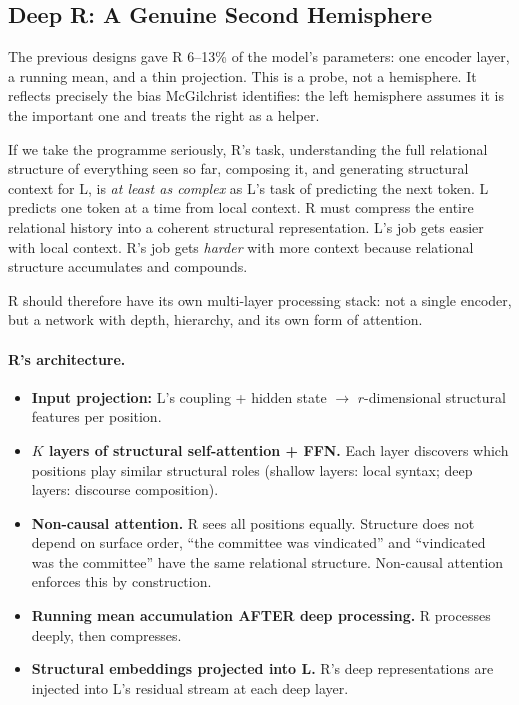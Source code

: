 \documentclass[11pt, a4paper]{article}
\theoremstyle{plain}
\theoremstyle{definition}
\theoremstyle{remark}
\begin{document}
\subsection{Deep R: A Genuine Second Hemisphere}
\label{sec:deep-r}

The previous designs gave R 6--13\% of the model's parameters: one encoder layer, a running mean, and a thin projection.
This is a probe, not a hemisphere.
It reflects precisely the bias McGilchrist identifies: the left hemisphere assumes it is the important one and treats the right as a helper.

If we take the programme seriously, R's task, understanding the full relational structure of everything seen so far, composing it, and generating structural context for L, is \emph{at least as complex} as L's task of predicting the next token.
L predicts one token at a time from local context.
R must compress the entire relational history into a coherent structural representation.
L's job gets easier with local context.
R's job gets \emph{harder} with more context because relational structure accumulates and compounds.

R should therefore have its own multi-layer processing stack: not a single encoder, but a network with depth, hierarchy, and its own form of attention.

\paragraph{R's architecture.}
\begin{itemize}[nosep]
\item \textbf{Input projection:} L's coupling + hidden state $\to$ $r$-dimensional structural features per position.
\item \textbf{$K$ layers of structural self-attention + FFN.} Each layer discovers which positions play similar structural roles (shallow layers: local syntax; deep layers: discourse composition).
\item \textbf{Non-causal attention.} R sees all positions equally. Structure does not depend on surface order, ``the committee was vindicated'' and ``vindicated was the committee'' have the same relational structure. Non-causal attention enforces this by construction.
\item \textbf{Running mean accumulation AFTER deep processing.} R processes deeply, then compresses.
\item \textbf{Structural embeddings projected into L.} R's deep representations are injected into L's residual stream at each deep layer.
\end{itemize}
\end{document}
